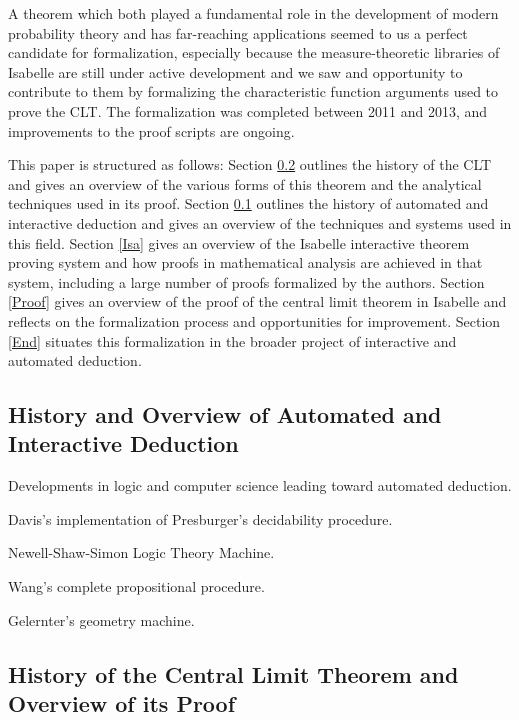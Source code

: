 \documentclass{amsart}
\theoremstyle{definition}
\theoremstyle{remark}
\begin{document}

A theorem which both played a fundamental role in the development of modern probability theory and has far-reaching applications seemed to us a perfect candidate for formalization, especially because the measure-theoretic libraries of Isabelle are still under active development and we saw and opportunity to contribute to them by formalizing the characteristic function arguments used to prove the CLT. The formalization was completed between 2011 and 2013, and improvements to the proof scripts are ongoing.

This paper is structured as follows: Section \ref{CLT} outlines the history of the CLT and gives an overview of the various forms of this theorem and the analytical techniques used in its proof. Section \ref{AutoDed} outlines the history of automated and interactive deduction and gives an overview of the techniques and systems used in this field. Section \ref{Isa} gives an overview of the Isabelle interactive theorem proving system and how proofs in mathematical analysis are achieved in that system, including a large number of proofs formalized by the authors. Section \ref{Proof} gives an overview of the proof of the central limit theorem in Isabelle and reflects on the formalization process and opportunities for improvement. Section \ref{End} situates this formalization in the broader project of interactive and automated deduction.

\subsection{History and Overview of Automated and Interactive Deduction} \label{AutoDed}

Developments in logic and computer science leading toward automated deduction.

Davis's implementation of Presburger's decidability procedure.

Newell-Shaw-Simon Logic Theory Machine.

Wang's complete propositional procedure.

Gelernter's geometry machine.

\subsection{History of the Central Limit Theorem and Overview of its Proof} \label{CLT}
\end{document}
